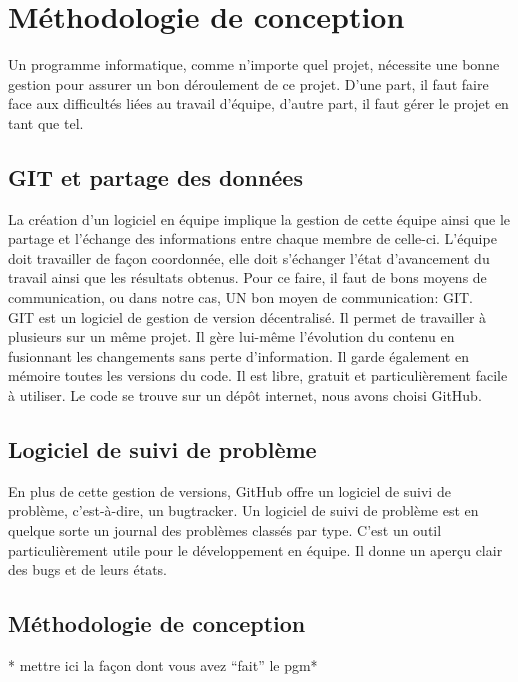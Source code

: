\chapter{Méthodologie de conception}
Un programme informatique, comme n'importe quel projet, nécessite une bonne gestion pour assurer un bon déroulement de ce projet.
D'une part, il faut faire face aux difficultés liées au travail d'équipe, d'autre part, il faut gérer le projet en tant que tel.

  \section{GIT et partage des données}
  La création d'un logiciel en équipe implique la gestion de cette équipe ainsi que le partage et l'échange des
  informations entre chaque membre de celle-ci.
  L'équipe doit travailler de façon coordonnée, elle doit s'échanger l'état
  d'avancement du travail ainsi que les résultats obtenus. Pour ce faire, il faut
  de bons moyens de communication, ou dans notre cas, UN bon moyen de communication: GIT\cite{git}. \\

  GIT est un logiciel de gestion de version décentralisé. Il permet de
  travailler à plusieurs sur un même projet. Il gère lui-même l'évolution du
  contenu en fusionnant les changements sans perte d'information. Il garde
  également en mémoire toutes les versions du code. Il est libre, gratuit et
  particulièrement facile à utiliser. Le code se trouve sur un dépôt internet, nous avons choisi GitHub\cite{github}.\\

  \section{Logiciel de suivi de problème}
  En plus de cette gestion de versions, GitHub offre un logiciel de suivi de problème, c'est-à-dire, un bugtracker.
  Un logiciel de suivi de problème est en quelque sorte un journal des problèmes classés par type.
  C'est un outil particulièrement utile pour le développement en équipe. Il donne un aperçu clair des bugs et de leurs états.

  \section{Méthodologie de conception}
    * mettre ici la façon dont vous avez \enquote{fait} le pgm* \\
    
